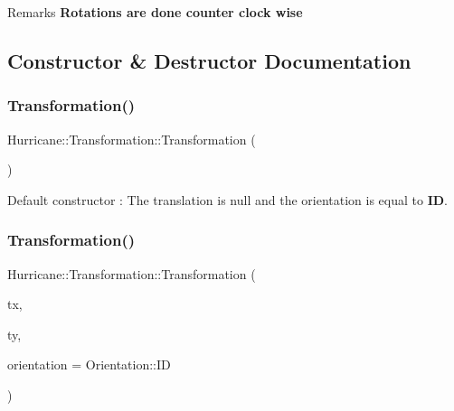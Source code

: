 \begin{DoxyRemark}{Remarks}
{\bfseries Rotations are done counter clock wise} 
\end{DoxyRemark}


\subsection{Constructor \& Destructor Documentation}
\mbox{\label{classHurricane_1_1Transformation_a7a28cd6c2f62898bc947dc3f41fe3bcf}} 
\subsubsection{\texorpdfstring{Transformation()}{Transformation()}\hspace{0.1cm}{\footnotesize\ttfamily [1/4]}}
{\footnotesize\ttfamily Hurricane\+::\+Transformation\+::\+Transformation (\begin{DoxyParamCaption}{ }\end{DoxyParamCaption})}

Default constructor \+: The translation is null and the orientation is equal to {\bfseries ID}. \mbox{\label{classHurricane_1_1Transformation_a6bb0e856cd0374bd6f38ee835a4744c0}} 
\subsubsection{\texorpdfstring{Transformation()}{Transformation()}\hspace{0.1cm}{\footnotesize\ttfamily [2/4]}}
{\footnotesize\ttfamily Hurricane\+::\+Transformation\+::\+Transformation (\begin{DoxyParamCaption}\item[{const \mbox{\hyperlink{group__DbUGroup_ga4fbfa3e8c89347af76c9628ea06c4146}{Db\+U\+::\+Unit}} \&}]{tx,  }\item[{const \mbox{\hyperlink{group__DbUGroup_ga4fbfa3e8c89347af76c9628ea06c4146}{Db\+U\+::\+Unit}} \&}]{ty,  }\item[{const \mbox{\hyperlink{classHurricane_1_1Transformation_1_1Orientation}{Orientation}} \&}]{orientation = {\ttfamily Orientation\+:\+:ID} }\end{DoxyParamCaption})}

